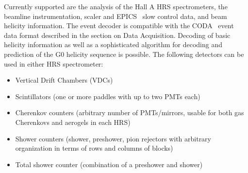 Currently supported are the analysis of the Hall A HRS spectrometers,
the beamline instrumentation, scaler and EPICS~\cite{EPICSwww} 
slow control data, and beam helicity information.
The event decoder is compatible with the CODA~\cite{CODAwww}
event data format described in the section on Data Acquisition. 
Decoding of basic helicity information as well as a sophisticated
algorithm for decoding and prediction of the G0 helicity sequence is
possible. The following detectors can be used in either HRS spectrometer:
\begin{itemize} \setlength{\parskip}{0ex}
  \item Vertical Drift Chambers (VDCs)
  \item Scintillators (one or more paddles with up to two PMTs each)
  \item Cherenkov counters (arbitrary number of PMTs/mirrors, 
        usable for both gas Cherenkovs and aerogels in each HRS)
  \item Shower counters (shower, preshower, pion rejectors with 
        arbitrary organization in terms of rows and columns of blocks)
  \item Total shower counter (combination of a preshower and shower)
\end{itemize}
